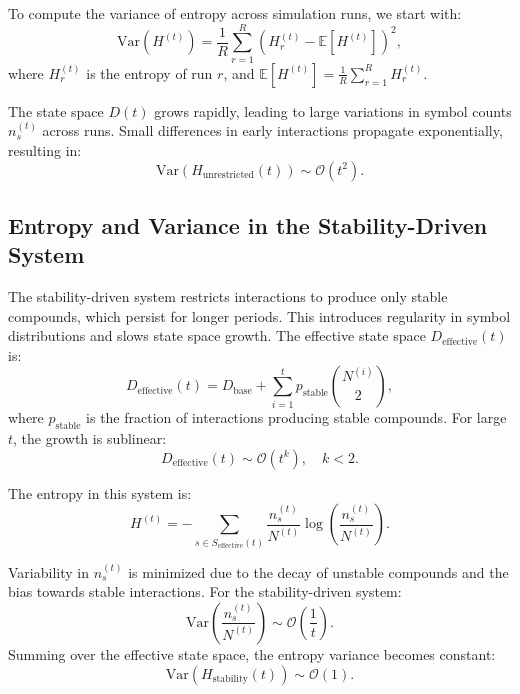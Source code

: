 \documentclass[%
 preprint, linenumbers,
 amsmath,amssymb,
 aps, physrev,
]{revtex4-2}
\begin{document}
To compute the variance of entropy across simulation runs, we start with:
\begin{equation}
    \text{Var}(H^{(t)}) = \frac{1}{R} \sum_{r=1}^R \left(H_r^{(t)} - \mathbb{E}[H^{(t)}]\right)^2,
\end{equation}
where \( H_r^{(t)} \) is the entropy of run \( r \), and \( \mathbb{E}[H^{(t)}] = \frac{1}{R} \sum_{r=1}^R H_r^{(t)} \).

The state space \( D(t) \) grows rapidly, leading to large variations in symbol counts \( n_s^{(t)} \) across runs. Small differences in early interactions propagate exponentially, resulting in:
\begin{equation}
    \text{Var}(H_\text{unrestricted}(t)) \sim \mathcal{O}(t^2).
\end{equation}

\subsection{Entropy and Variance in the Stability-Driven System}

The stability-driven system restricts interactions to produce only stable compounds, which persist for longer periods. This introduces regularity in symbol distributions and slows state space growth. The effective state space \( D_\text{effective}(t) \) is:
\begin{equation}
    D_\text{effective}(t) = D_\text{base} + \sum_{i=1}^t p_\text{stable} \binom{N^{(i)}}{2},
\end{equation}
where \( p_\text{stable} \) is the fraction of interactions producing stable compounds. For large \( t \), the growth is sublinear:
\begin{equation}
    D_\text{effective}(t) \sim \mathcal{O}(t^k), \quad k < 2.
\end{equation}

The entropy in this system is:
\begin{equation}
    H^{(t)} = -\sum_{s \in S_\text{effective}(t)} \frac{n_s^{(t)}}{N^{(t)}} \log \left( \frac{n_s^{(t)}}{N^{(t)}} \right).
\end{equation}

Variability in \( n_s^{(t)} \) is minimized due to the decay of unstable compounds and the bias towards stable interactions. For the stability-driven system:
\begin{equation}
    \text{Var}\left(\frac{n_s^{(t)}}{N^{(t)}}\right) \sim \mathcal{O}\left(\frac{1}{t}\right).
\end{equation}
Summing over the effective state space, the entropy variance becomes constant:
\begin{equation}
    \text{Var}(H_\text{stability}(t)) \sim \mathcal{O}(1).
\end{equation}
\end{document}
